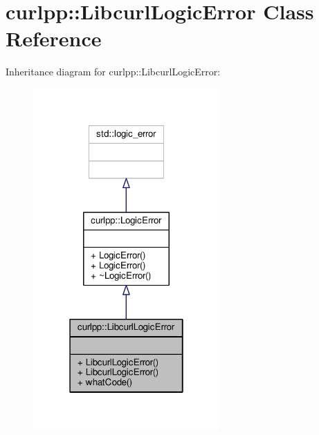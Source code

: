 \hypertarget{classcurlpp_1_1LibcurlLogicError}{\section{curlpp\-:\-:Libcurl\-Logic\-Error Class Reference}
\label{classcurlpp_1_1LibcurlLogicError}
}


Inheritance diagram for curlpp\-:\-:Libcurl\-Logic\-Error\-:\nopagebreak
\begin{figure}[H]
\begin{center}
\leavevmode
\includegraphics[width=202pt]{classcurlpp_1_1LibcurlLogicError__inherit__graph}
\end{center}
\end{figure}


